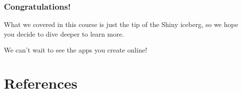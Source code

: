 \documentclass[
  letterpaper,
  DIV=11,
  numbers=noendperiod]{scrreprt}
\newlength{\cslhangindent}
\newlength{\cslentryspacingunit} %
\newenvironment{CSLReferences}[2] %
 {%
  \setlength{\parindent}{0pt}
  \ifodd #1
  \let\oldpar\par
  \def\par{\hangindent=\cslhangindent\oldpar}
  \fi
  \setlength{\parskip}{#2\cslentryspacingunit}
 }%
 {}
\begin{document}
\hypertarget{congratulations-1}{%
\subsection{Congratulations!}\label{congratulations-1}}

What we covered in this course is just the tip of the Shiny iceberg, so
we hope you decide to dive deeper to learn more.

We can't wait to see the apps you create online!

\hypertarget{references}{%
\chapter*{References}\label{references}}

\hypertarget{refs}{}
\begin{CSLReferences}{0}{0}
\end{CSLReferences}
\end{document}
